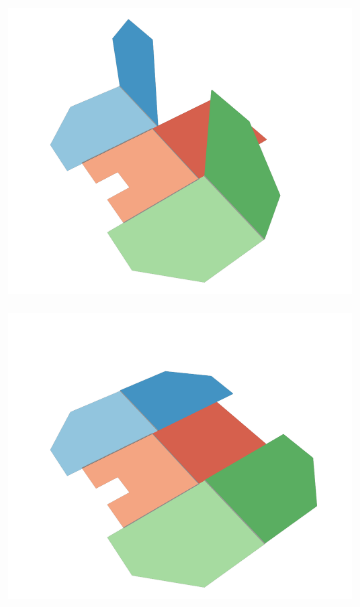 \begin{figure}[h]
\begin{subfigure}[t]{\subfigureWidth}
		\label{fig:sub:deployment-sequence-ismenius-cavus-full-bow-and-stern}
	\end{subfigure}\\[0.8ex]
	\begin{subfigure}[t]{\subfigureWidth}
        \centering
		\includegraphics[height=\graphicsHeight]{sections/design/solar-array/images/deployment/ismenius-cavus/solar_array_deployment_ismenius_cavus_100.png}
		\label{fig:sub:deployment-sequence-ismenius-cavus-mid-quarter}
	\end{subfigure}\hspace*{2.5cm}
    \begin{subfigure}[t]{\subfigureWidth}
        \centering
		\includegraphics[height=\graphicsHeight]{sections/design/solar-array/images/deployment/ismenius-cavus/solar_array_deployment_ismenius_cavus_130.png}

\end{subfigure}
\end{figure}
